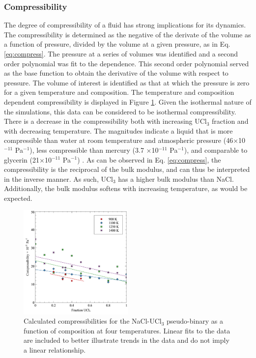 \documentclass[preprint,3p,10pt,onecolumn,number,sort&compress]{elsarticle}
\begin{document}
{\FloatBarrier

\subsubsection{Compressibility}

The degree of compressibility of a fluid has strong implications for its dynamics. The compressibility is determined as the negative of the derivate of the volume as a function of pressure, divided by the volume at a given pressure, as in Eq. \ref{eq:compress}. The pressure at a series of volumes was identified and a second order polynomial was fit to the dependence. This second order polynomial served as the base function to obtain the derivative of the volume with respect to pressure. The volume of interest is identified as that at which the pressure is zero for a given temperature and composition. The temperature and composition dependent compressibility is displayed in Figure \ref{fig:compress}. Given the isothermal nature of the simulations, this data can be considered to be isothermal compressibility. There is a decrease in the compressibility both with increasing UCl$_3$ fraction and with decreasing temperature. The magnitudes indicate a liquid that is more compressible than water at room temperature and atmospheric pressure (46$\times$10$^{-11}$ Pa$^{-1}$), less compressible than mercury (3.7 $\times$10$^{-11}$ Pa$^{-1}$), and comparable to glycerin (21$\times$10$^{-11}$ Pa$^{-1}$) \cite{aiphandbook}. As can be observed in Eq. \ref{eq:compress}, the compressibility is the reciprocal of the bulk modulus, and can thus be interpreted in the inverse manner. As such, UCl$_3$ has a higher bulk modulus than NaCl. Additionally, the bulk modulus softens with increasing temperature, as would be expected.  

\begin{figure}[htb]
\centering
\includegraphics[width=0.5\textwidth]{figbulk.jpg}
\caption{Calculated compressibilities for the NaCl-UCl{$_3$} pseudo-binary as a function of composition at four temperatures. Linear fits to the data are included to better illustrate trends in the data and do not imply a linear relationship.} 
\label{fig:compress}
\end{figure}

}
\end{document}

